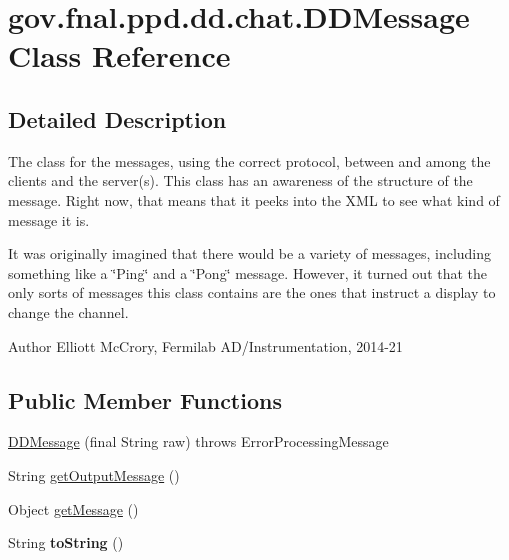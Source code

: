 \hypertarget{classgov_1_1fnal_1_1ppd_1_1dd_1_1chat_1_1DDMessage}{\section{gov.\-fnal.\-ppd.\-dd.\-chat.\-D\-D\-Message Class Reference}
\label{classgov_1_1fnal_1_1ppd_1_1dd_1_1chat_1_1DDMessage}
}


\subsection{Detailed Description}
The class for the messages, using the correct protocol, between and among the clients and the server(s). This class has an awareness of the structure of the message. Right now, that means that it peeks into the X\-M\-L to see what kind of message it is.

It was originally imagined that there would be a variety of messages, including something like a \char`\"{}\-Ping\char`\"{} and a \char`\"{}\-Pong\char`\"{} message. However, it turned out that the only sorts of messages this class contains are the ones that instruct a display to change the channel.

\begin{DoxyAuthor}{Author}
Elliott Mc\-Crory, Fermilab A\-D/\-Instrumentation, 2014-\/21 
\end{DoxyAuthor}
\subsection*{Public Member Functions}
\begin{DoxyCompactItemize}
\item 
\hyperlink{classgov_1_1fnal_1_1ppd_1_1dd_1_1chat_1_1DDMessage_a4e12b6c5ebadc164c409b32516612c61}{D\-D\-Message} (final String raw)  throws Error\-Processing\-Message 
\item 
String \hyperlink{classgov_1_1fnal_1_1ppd_1_1dd_1_1chat_1_1DDMessage_a01b517b9e7b2acc2524cbd92c76d7fa6}{get\-Output\-Message} ()
\item 
Object \hyperlink{classgov_1_1fnal_1_1ppd_1_1dd_1_1chat_1_1DDMessage_ae33fd36c9f1fe620862f668cf58d11cc}{get\-Message} ()
\item 
\hypertarget{classgov_1_1fnal_1_1ppd_1_1dd_1_1chat_1_1DDMessage_a632b738d2bc786effaa8b5b58aff590f}{String {\bfseries to\-String} ()}\label{classgov_1_1fnal_1_1ppd_1_1dd_1_1chat_1_1DDMessage_a632b738d2bc786effaa8b5b58aff590f}

\end{DoxyCompactItemize}


